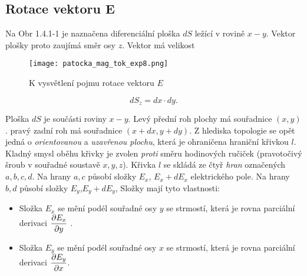       \subsection{Rotace vektoru E}\label{ES:sec05}
        Na Obr 1.4.1-1 je naznačena diferenciální ploška \(dS\) ležící v rovině \(x-y\). Vektor 
        plošky proto zaujímá směr osy \(z\). Vektor má velikost
        \begin{figure}[ht!]
          \centering
          \texttt{[image: patocka\_mag\_tok\_exp8.png]}
          \caption{K vysvětlení pojmu rotace vektoru \(E\)}
          \label{es:fig_patocka_mag_tok_exp8}
        \end{figure}
        
        \begin{equation}\label{ES:eq_zakl_elm31}
          dS_z= dx\cdot dy.
        \end{equation}
              
        Ploška \(dS\) je součásti roviny \(x-y\). Levý přední roh plochy má souřadnice \((x,y)\). 
        pravý zadní roh má souřadnice \((x+dx, y+dy)\). Z hlediska topologie se opět jedná o 
        \emph{orientovanou} a \emph{uzavřenou plochu}, která je ohraničena hraniční křivkou \(l\). 
        Kladný smysl oběhu křivky je zvolen \emph{proti} směru hodinových ručiček (pravotočivý 
        šroub v souřadné soustavě \(x, y, z\)). Křivka \(l\) se skládá ze čtyř \emph{hran} 
        označených \(a, b, c, d\). Na hrany \(a, c\) působí složky \(E_x\), \(E_x+dE_x\) 
        elektrického pole. Na hrany 
        \(b, d\) působí složky \(E_y\),\(E_y + dE_y\), Složky mají tyto vlastnosti:
        \begin{itemize}\addtolength{\itemsep}{-0.5\baselineskip}
          \item Složka \(E_x\) se mění podél souřadné osy \(y\) se strmostí, která je rovna 
                parciální derivaci \(\dfrac{\partial E_x}{\partial y}\) .
          \item Složka \(E_y\) se mění podél souřadné osy \(x\) se strmostí, která je rovna 
                parciální derivaci \(\dfrac{\partial E_y}{\partial x}\). 
        \end{itemize}
        
